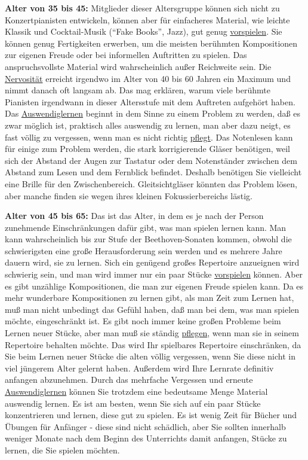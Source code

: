 \textbf{Alter von 35 bis 45:}
Mitglieder dieser Altersgruppe können sich nicht zu Konzertpianisten entwickeln, können aber für einfacheres Material, wie leichte Klassik und Cocktail-Musik (\enquote{Fake Books}, Jazz), gut genug \hyperlink{c1iii14}{vorspielen}.
Sie können genug Fertigkeiten erwerben, um die meisten berühmten Kompositionen zur eigenen Freude oder bei informellen Auftritten zu spielen.
Das anspruchsvollste Material wird wahrscheinlich außer Reichweite sein.
Die \hyperlink{c1iii15}{Nervosität} erreicht irgendwo im Alter von 40 bis 60 Jahren ein Maximum und nimmt danach oft langsam ab. 
Das mag erklären, warum viele berühmte Pianisten irgendwann in dieser Altersstufe mit dem Auftreten aufgehört haben.
Das \hyperlink{c1iii6}{Auswendiglernen} beginnt in dem Sinne zu einem Problem zu werden, daß es zwar möglich ist, praktisch alles auswendig zu lernen, man aber dazu neigt, es fast völlig zu vergessen, wenn man es nicht richtig \hyperlink{c1iii6c}{pflegt}.
Das Notenlesen kann für einige zum Problem werden, die stark korrigierende Gläser benötigen, weil sich der Abstand der Augen zur Tastatur oder dem Notenständer zwischen dem Abstand zum Lesen und dem Fernblick befindet.
Deshalb benötigen Sie vielleicht eine Brille für den Zwischenbereich.
Gleitsichtgläser könnten das Problem lösen, aber manche finden sie wegen ihres kleinen Fokussierbereichs lästig.


\hypertarget{c1iii18c45}{}

\textbf{Alter von 45 bis 65:}
Das ist das Alter, in dem es je nach der Person zunehmende Einschränkungen dafür gibt, was man spielen lernen kann.
Man kann wahrscheinlich bis zur Stufe der Beethoven-Sonaten kommen, obwohl die schwierigsten eine große Herausforderung sein werden und es mehrere Jahre dauern wird, sie zu lernen.
Sich ein genügend großes Repertoire anzueignen wird schwierig sein, und man wird immer nur ein paar Stücke \hyperlink{c1iii14}{vorspielen} können.
Aber es gibt unzählige Kompositionen, die man zur eigenen Freude spielen kann.
Da es mehr wunderbare Kompositionen zu lernen gibt, als man Zeit zum Lernen hat, muß man nicht unbedingt das Gefühl haben, daß man bei dem, was man spielen möchte, eingeschränkt ist.
Es gibt noch immer keine großen Probleme beim Lernen neuer Stücke, aber man muß sie ständig \hyperlink{c1iii6c}{pflegen}, wenn man sie in seinem Repertoire behalten möchte.
Das wird Ihr spielbares Repertoire einschränken, da Sie beim Lernen neuer Stücke die alten völlig vergessen, wenn Sie diese nicht in viel jüngerem Alter gelernt haben.
Außerdem wird Ihre Lernrate definitiv anfangen abzunehmen.
Durch das mehrfache Vergessen und erneute \hyperlink{c1iii6}{Auswendiglernen} können Sie trotzdem eine bedeutsame Menge Material auswendig lernen.
Es ist am besten, wenn Sie sich auf ein paar Stücke konzentrieren und lernen, diese gut zu spielen.
Es ist wenig Zeit für Bücher und Übungen für Anfänger - diese sind nicht schädlich, aber Sie sollten innerhalb weniger Monate nach dem Beginn des Unterrichts damit anfangen, Stücke zu lernen, die Sie spielen möchten.


